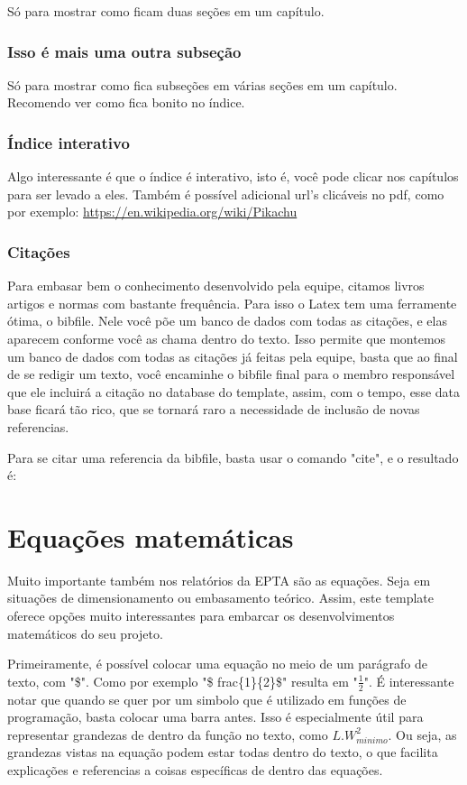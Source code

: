 Só para mostrar como ficam duas seções em um capítulo.

\subsection{Isso é mais uma outra subseção}

Só para mostrar como fica subseções em várias seções em um capítulo. Recomendo ver como fica bonito no índice.

\subsection{Índice interativo}

Algo interessante é que o índice é interativo, isto é, você pode clicar nos capítulos para ser levado a eles. Também é possível adicional url's clicáveis no pdf, como por exemplo: \url{https://en.wikipedia.org/wiki/Pikachu}

\subsection{Citações}

Para embasar bem o conhecimento desenvolvido pela equipe, citamos livros artigos e normas com bastante frequência. Para isso o Latex tem uma ferramente ótima, o bibfile. Nele você põe um banco de dados com todas as citações, e elas aparecem conforme você as chama dentro do texto. Isso permite que montemos um banco de dados com todas as citações já feitas pela equipe, basta que ao final de se redigir um texto, você encaminhe o bibfile final para o membro responsável que ele incluirá a citação no database do template, assim, com o tempo, esse data base ficará tão rico, que se tornará raro a necessidade de inclusão de novas referencias.

Para se citar uma referencia da bibfile, basta usar o comando "cite", e o resultado é: \cite{CavaliniJunior2015}

\chapter{Equações matemáticas}


Muito importante também nos relatórios da EPTA são as equações. Seja em situações de dimensionamento ou embasamento teórico. Assim, este template oferece opções muito interessantes para embarcar os desenvolvimentos matemáticos do seu projeto. 

Primeiramente, é possível colocar uma equação no meio de um parágrafo de texto, com "\$". Como por exemplo "\$ frac\{1\}\{2\}\$" resulta em "$\frac{1}{2}$". É interessante notar que quando se quer por um simbolo que é utilizado em funções de programação, basta colocar uma barra antes. Isso é especialmente útil para representar grandezas de dentro da função no texto, como $L.W_{minimo}^2$. Ou seja, as grandezas vistas na equação podem estar todas dentro do texto, o que facilita explicações e referencias a coisas específicas de dentro das equações.

